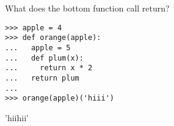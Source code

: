 \begin{blocksection}
\question What does the bottom function call return?

\begin{lstlisting}
>>> apple = 4
>>> def orange(apple):
...   apple = 5
...   def plum(x):
...     return x * 2
...   return plum
...
>>> orange(apple)('hiii')

\end{lstlisting}

\begin{solution}
'hiihii'
\end{solution}
\end{blocksection}